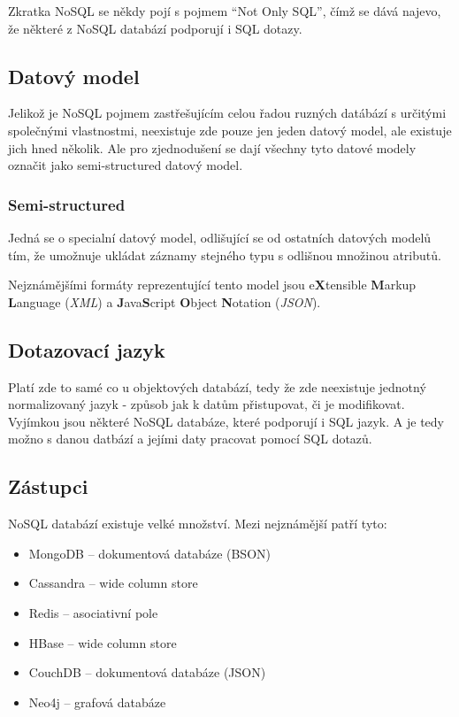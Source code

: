 Zkratka NoSQL se někdy pojí s pojmem "`Not Only SQL"', čímž se dává najevo, že některé z NoSQL databází podporují i SQL dotazy.

\subsection{Datový model}
Jelikož je NoSQL pojmem zastřešujícím celou řadou ruzných datábází s určitými společnými vlastnostmi, neexistuje zde pouze jen jeden datový model, ale existuje jich hned několik. Ale pro zjednodušení se dají všechny tyto datové modely označit jako semi-structured datový model.
\subsubsection{Semi-structured}
Jedná se o specialní datový model, odlišující se od ostatních datových modelů tím, že umožnuje ukládat záznamy stejného typu s odlišnou množinou atributů.

Nejznámějšími formáty reprezentující tento model jsou e\textbf{X}tensible \textbf{M}arkup \textbf{L}anguage (\emph{XML}) a \textbf{J}ava\textbf{S}cript \textbf{O}bject \textbf{N}otation (\emph{JSON}).

\subsection{Dotazovací jazyk}
Platí zde to samé co u objektových databází, tedy že zde neexistuje jednotný normalizovaný jazyk - způsob jak k datům přistupovat, či je modifikovat. Vyjímkou jsou některé NoSQL databáze, které podporují i SQL jazyk. A je tedy možno s danou datbází a jejími daty pracovat pomocí SQL dotazů.

\subsection{Zástupci}
NoSQL databází existuje velké množství. Mezi nejznámější patří tyto:
\begin{itemize}
  \item MongoDB -- dokumentová databáze (BSON)
  \item Cassandra -- wide column store 
  \item Redis -- asociativní pole
  \item HBase -- wide column store 
  \item CouchDB -- dokumentová databáze (JSON)
  \item Neo4j -- grafová databáze
\end{itemize}
